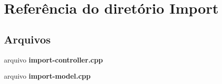 \section{Referência do diretório Import}
\label{dir_241c91d9d8a44aef08b93cfa24e4283d}
\subsection*{Arquivos}
\begin{DoxyCompactItemize}
\item 
arquivo {\bf import-\/controller.\+cpp}
\item 
arquivo {\bf import-\/model.\+cpp}
\end{DoxyCompactItemize}
